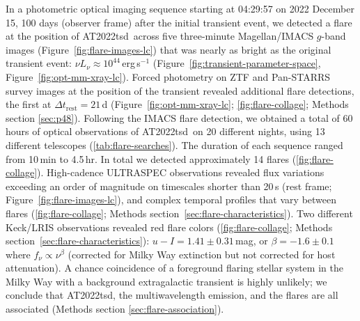 \documentclass{nature_plusfigure}
\newcommand{\at}{AT2022tsd}
\begin{document}
In a photometric optical imaging sequence starting at 04:29:57 on 2022 December 15, 100 days (observer frame) after the initial transient event, we detected\cite{Ho2022_Astronote_Flares} a flare at the position of \at\ across five three-minute Magellan/IMACS $g$-band images (Figure~\ref{fig:flare-images-lc}) that was nearly as bright as the original transient event: $\nu L_\nu \approx 10^{44}\,$erg\,s$^{-1}$ (Figure~\ref{fig:transient-parameter-space}, Figure~\ref{fig:opt-mm-xray-lc}).
Forced photometry on ZTF and Pan-STARRS survey\cite{Tonry2012,Chambers2016} images at the position of the transient revealed additional flare detections, the first at $\Delta t_\mathrm{rest}=21$\,d (Figure~\ref{fig:opt-mm-xray-lc}; \ref{fig:flare-collage}; Methods section \ref{sec:p48}).
Following the IMACS flare detection, we obtained a total of 60 hours of optical observations of \at\ on 20 different nights, using 13 different telescopes (\ref{tab:flare-searches}). The duration of each sequence ranged from 10\,min to 4.5\,hr. In total we detected approximately 14 flares (\ref{fig:flare-collage}). High-cadence ULTRASPEC\cite{Dhillon2014} observations revealed flux variations exceeding an order of magnitude on timescales shorter than 20\,s (rest frame; Figure~\ref{fig:flare-images-lc}), and complex temporal profiles that vary between flares (\ref{fig:flare-collage}; Methods section~\ref{sec:flare-characteristics}).
Two different Keck/LRIS observations revealed red flare colors (\ref{fig:flare-collage}; Methods section~\ref{sec:flare-characteristics}):
$u-I=1.41\pm0.31\,$mag, or $\beta=-1.6\pm0.1$ where
$f_\nu \propto \nu^{\beta}$ (corrected for Milky Way extinction but not corrected for host attenuation).
A chance coincidence of a foreground flaring stellar system in the Milky Way with a background extragalactic transient is highly unlikely; we conclude that \at, the multiwavelength emission, and the flares are all associated (Methods section \ref{sec:flare-association}).
\end{document}
